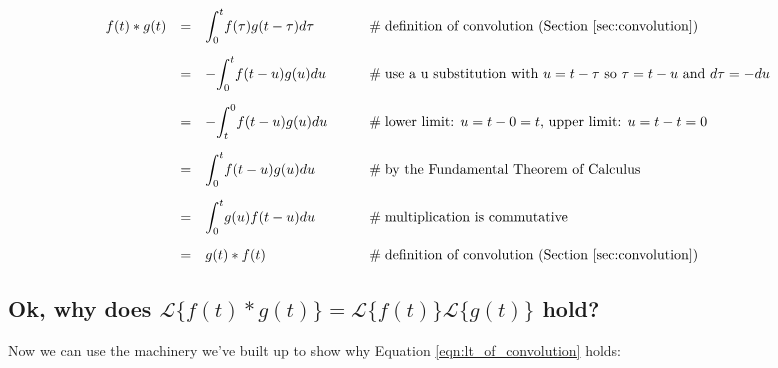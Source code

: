 \documentclass{article}
\theoremstyle{definition}
\begin{document}
\begin{equation*}
\begin{array}{lllll}
f(t) \ast g(t)                                                                                                                          
&=& \mathlarger{\int}^t_0 f(\tau) g(t - \tau) d\tau                  &\qquad \mathrel{\#} \text{definition of convolution (Section \ref{sec:convolution})}                                 \\
[15pt]
&=& -\mathlarger{\int}^t_0 f(t -u) g(u) du                              &\qquad \mathrel{\#} \text{use a u substitution with $u = t - \tau$ so $\tau = t -u$ and $d\tau = -du$}     \\
[15pt]
&=& - \mathlarger{\int}^0_t f(t -u) g(u) du                             &\qquad \mathrel{\#} \text{lower limit: $u = t - 0 = t$, upper limit: $u = t - t = 0$}                                     \\
[15pt]
&=& \mathlarger{\int}^t_0 f(t -u) g(u) du                               &\qquad \mathrel{\#} \text{by the Fundamental Theorem of Calculus}                                                      \\
[15pt]
&=& \mathlarger{\int}^t_0 g(u) f(t -u) du                               &\qquad \mathrel{\#} \text{multiplication is commutative}                                                                          \\
[15pt]
&=& g(t) \ast f(t)                                                                    &\qquad \mathrel{\#} \text{definition of convolution (Section \ref{sec:convolution})}
\end{array}
\end{equation*}

\newpage
\subsection{Ok, why does $\mathcal{L}\{f(t) \ast g(t)\} =  \mathcal{L}\{f(t)\}\mathcal{L}\{g(t)\}$ hold?}

\bigskip
\noindent
Now we can use the machinery we've built up to show why Equation \ref{eqn:lt_of_convolution} holds:
\end{document}
